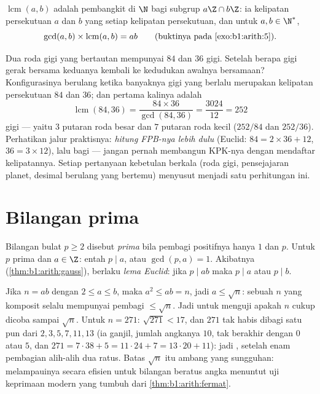 \begin{definition}\label{def:b1:arith:lcm}
$\operatorname{lcm}(a, b)$ adalah
pembangkit di $\N$ bagi subgrup $a\Z \cap b\Z$: ia kelipatan
persekutuan $a$ dan $b$ yang  setiap kelipatan persekutuan, dan untuk
$a, b \in \N^*$,
\[
\gcd(a,b) \times \operatorname{lcm}(a,b) = ab
\qquad (\text{buktinya pada } \cref{exo:b1:arith:5}).
\]
\end{definition}

\begin{example}\label{ex:b1:arith:gears}
Dua roda gigi yang bertautan mempunyai $84$ dan $36$ gigi. Setelah berapa gigi
gerak bersama keduanya kembali ke kedudukan awalnya bersamaan?
Konfigurasinya berulang ketika banyaknya gigi yang berlalu merupakan
kelipatan persekutuan $84$ dan $36$; dan pertama kalinya adalah
\[
\operatorname{lcm}(84, 36) = \frac{84 \times 36}{\gcd(84, 36)}
= \frac{3024}{12} = 252
\]
gigi --- yaitu $3$ putaran roda besar dan $7$ putaran roda
kecil ($252/84$ dan $252/36$). Perhatikan jalur praktisnya:
\emph{hitung FPB-nya lebih dulu} (Euclid: $84 = 2\times36 + 12$, $36
= 3\times12$), lalu bagi --- jangan pernah membangun KPK-nya dengan mendaftar
kelipatannya. Setiap pertanyaan kebetulan berkala (roda gigi, pensejajaran
planet, desimal berulang yang bertemu) menyusut menjadi satu
perhitungan ini.
\end{example}

\section{Bilangan prima}

\begin{definition}\label{def:b1:arith:prime}
Bilangan bulat $p \geq 2$ disebut \emph{prima} bila
pembagi positifnya hanya $1$ dan $p$. Untuk $p$ prima dan $a \in \Z$:
entah $p \mid a$, atau $\gcd(p, a) = 1$. Akibatnya
(\cref{thm:b1:arith:gauss}), berlaku \emph{lema Euclid}: jika $p \mid
ab$ maka $p \mid a$ atau $p \mid b$.
\end{definition}

\begin{remark}\label{rem:b1:arith:trialdivision}
Jika $n = ab$ dengan $2 \leq a \leq b$, maka $a^2 \leq ab = n$, jadi $a
\leq \sqrt n$: sebuah $n$ yang komposit selalu mempunyai pembagi  $\leq
\sqrt n$. Jadi untuk menguji apakah $n$  cukup dicoba
 sampai $\sqrt n$. Untuk $n = 271$: $\sqrt{271} < 17$, dan
$271$ tak habis dibagi satu pun dari $2, 3, 5, 7, 11, 13$ (ia ganjil, jumlah
angkanya $10$, tak berakhir dengan $0$ atau $5$, dan $271 = 7\cdot38 + 5 =
11\cdot24 + 7 = 13\cdot20 + 11$): jadi , setelah enam pembagian
alih-alih dua ratus. Batas $\sqrt n$ itu ambang yang sungguhan:
melampauinya secara efisien untuk bilangan beratus angka
menuntut uji keprimaan modern yang tumbuh dari
\cref{thm:b1:arith:fermat}.
\end{remark}

